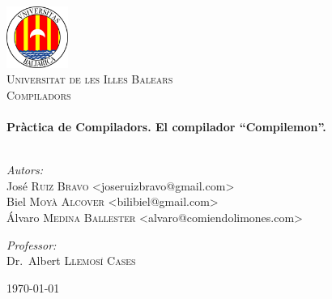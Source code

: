 \begin{titlepage}

\begin{center}


\includegraphics[width=0.15\textwidth]{logo}\\[1cm]    

\textsc{\LARGE Universitat de les Illes Balears}\\[1.5cm]

\textsc{\Large Compiladors}\\[0.5cm]


\HRule \\[0.4cm]
{ \huge \bfseries Pràctica de Compiladors. El compilador ``Compilemon''.}\\[0.4cm]

\HRule \\[1.5cm]

\begin{minipage}{0.4\textwidth}
\begin{flushleft} \large
\emph{Autors:}\\
\small José \textsc{Ruiz Bravo} <joseruizbravo@gmail.com>\\
\small Biel \textsc{Moyà Alcover}  <bilibiel@gmail.com>\\
\small Álvaro \textsc{Medina Ballester}  <alvaro@comiendolimones.com>\\
\end{flushleft}
\end{minipage}
\begin{minipage}{0.4\textwidth}
\begin{flushright} \large
\emph{Professor:} \\
Dr.~Albert \textsc{Llemosí Cases}
\end{flushright}
\end{minipage}

\vfill

{\large \today}

\end{center}

\end{titlepage}

